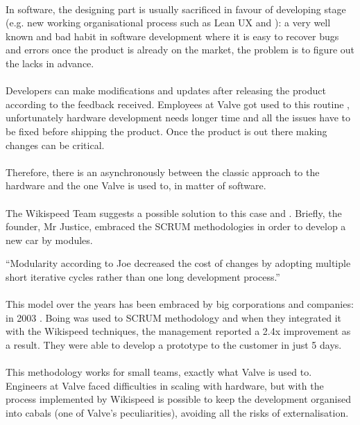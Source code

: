 \documentclass[12pt,twoside,notitle,a4paper]{article}
\begin{document}
\paragraph{}In software, the designing part is usually sacrificed in favour of developing stage (e.g. new working organisational process such as Lean UX \citep*{liikkanen2014lean} and \citep*{may2012applyi}): 
a very well known and bad habit in software development where it is easy to recover bugs and errors once the product is already on the market, the problem is to figure out the lacks in advance.
\paragraph{}Developers can make modifications and updates after releasing the product according to the feedback received. Employees at Valve got used to this routine \citep*{valveScrum}, unfortunately hardware development needs longer time and all the issues have to be fixed before shipping the product. Once the product is out there making changes can be critical.
\paragraph{}Therefore, there is an asynchronously between the classic approach to the hardware and the one Valve is used to, in matter of software.
\paragraph{}The Wikispeed Team suggests a possible solution to this case \citep*{Wikispeed} and \citep*{denning2012agile}. Briefly, the founder, Mr Justice, embraced the SCRUM methodologies in order to develop a new car by modules.


“Modularity according to Joe decreased the cost of changes by adopting multiple short iterative cycles rather than one long development process.”

\paragraph{}This model over the years has been embraced by big corporations and companies: in 2003 \citep*{Wikispeed}. Boing was used to SCRUM methodology and when they integrated it with the Wikispeed techniques, the management reported a 2.4x improvement as a result. They were able to develop a prototype to the customer in just 5 days.
\paragraph{}This methodology works for small teams, exactly what Valve is used to. 
Engineers at Valve faced difficulties in scaling with hardware, but with the process implemented by Wikispeed  is possible to keep the development organised into cabals (one of Valve’s peculiarities), avoiding all the risks of externalisation.
\end{document}
